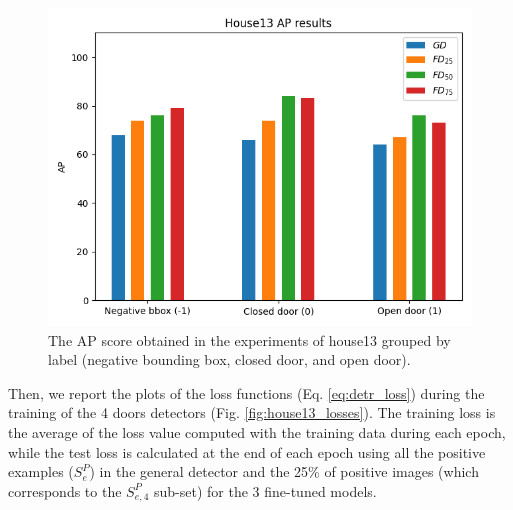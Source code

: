 \begin{figure}[h!]
	\centering
	\includegraphics[width=0.86\linewidth]{images/house13_AP_results.png}
	\caption{The AP score obtained in the experiments of \textsf{house13} grouped by label (negative bounding box, closed door, and open door).}
	\label{fig:house13_AP_results}
\end{figure}

Then, we report the plots of the loss functions (Eq. \ref{eq:detr_loss}) during the training of the 4 doors detectors (Fig. \ref{fig:house13_losses}). The training loss is the average of the loss value computed with the training data during each epoch, while the test loss is calculated at the end of each epoch using all the positive examples ($S^{P}_e$) in the general detector and the 25\% of positive images (which corresponds to the $S^{P}_{e,4}$ sub-set) for the 3 fine-tuned models.

